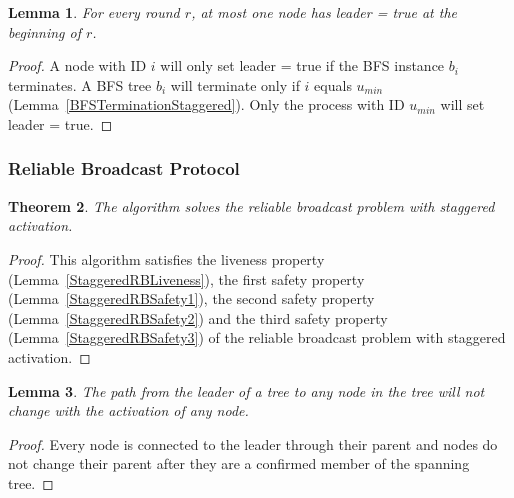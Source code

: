 \documentclass[english]{article}
\newtheorem{theorem}{Theorem}[section]
\newtheorem{lemma}[theorem]{Lemma}
\begin{document}
\begin{lemma}
\label{LESafetyStaggered}
For every round $r$, at most one node has leader = true at the beginning of $r$.
\end{lemma}
\begin{proof}
A node with ID $i$ will only set leader = true if the BFS instance $b_i$ terminates.
A BFS tree $b_i$ will terminate only if $i$ equals $u_{min}$ (Lemma~\ref{BFSTerminationStaggered}).
Only the process with ID $u_{min}$ will set leader = true. 
\end{proof}


\subsubsection{Reliable Broadcast Protocol}

\begin{theorem}
\label{StaggeredReliableBroadcast}
  The algorithm solves the reliable broadcast problem with staggered activation.
\end{theorem}
\begin{proof}
This algorithm satisfies the liveness property (Lemma~\ref{StaggeredRBLiveness}), 
the first safety property (Lemma~\ref{StaggeredRBSafety1}),
the second safety property (Lemma~\ref{StaggeredRBSafety2}) and 
the third safety property (Lemma~\ref{StaggeredRBSafety3}) of the reliable broadcast problem with staggered activation.
\end{proof}

\begin{lemma}
\label{StaggeredStablePath}
The path from the leader of a tree to any node in the tree will not change with the activation of any node.
\end{lemma}
\begin{proof}
Every node is connected to the leader through their parent and nodes do not change their parent after they are a confirmed member of the spanning tree.
\end{proof}
\end{document}
